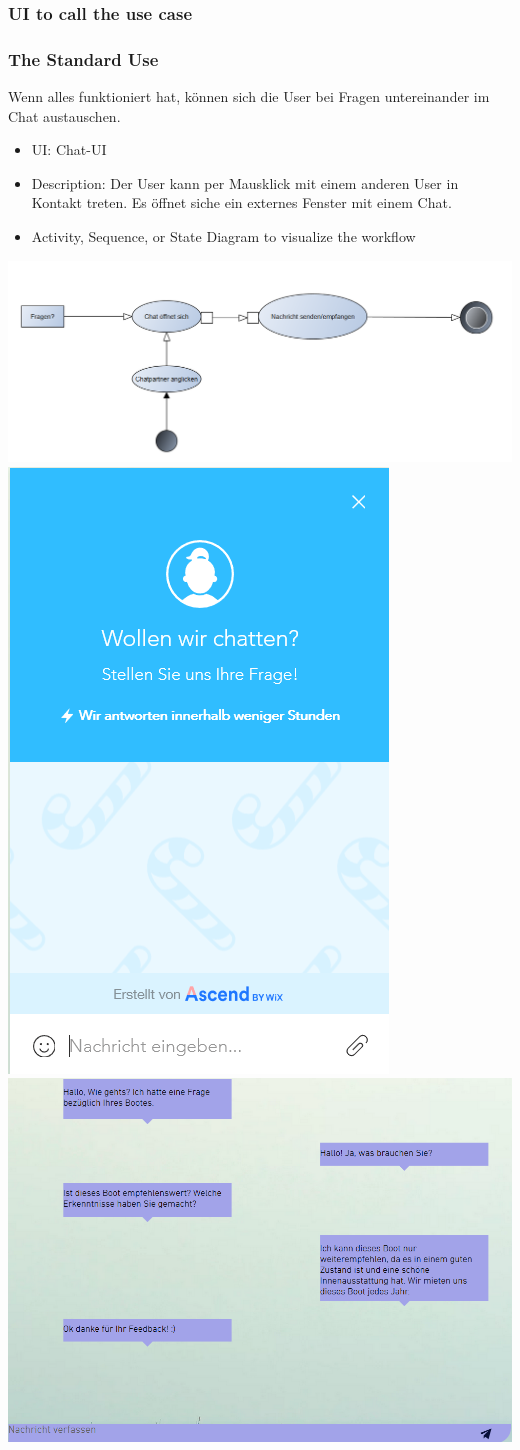 \documentclass[12pt]{article}
\theoremstyle{definition}
\begin{document}
\subsubsection{UI to call the use case}

\subsubsection{The Standard Use}
Wenn alles funktioniert hat, können sich die User bei Fragen untereinander im Chat austauschen.
\begin{itemize}
	\item UI: Chat-UI
	\item Description: Der User kann per Mausklick mit einem anderen User in Kontakt treten. Es öffnet siche ein externes Fenster mit einem Chat. 
	\item Activity, Sequence, or State Diagram to visualize the workflow
\end{itemize}
\includegraphics[height=0.40\textwidth]{Chatten.PNG}
\includegraphics[height=0.40\textwidth]{SupportChat.PNG}
\includegraphics[height=0.40\textwidth]{Chat.PNG}
\end{document}
